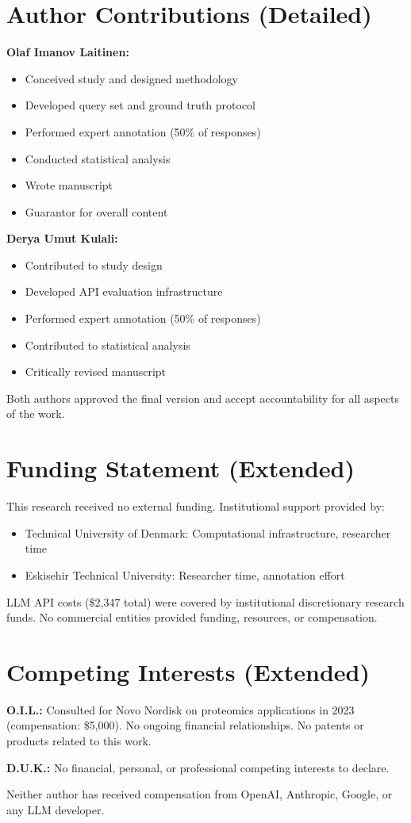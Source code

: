\documentclass[11pt,a4paper]{article}
\begin{document}
\section{Author Contributions (Detailed)}

\textbf{Olaf Imanov Laitinen:}
\begin{itemize}
    \item Conceived study and designed methodology
    \item Developed query set and ground truth protocol
    \item Performed expert annotation (50\% of responses)
    \item Conducted statistical analysis
    \item Wrote manuscript
    \item Guarantor for overall content
\end{itemize}

\textbf{Derya Umut Kulali:}
\begin{itemize}
    \item Contributed to study design
    \item Developed API evaluation infrastructure
    \item Performed expert annotation (50\% of responses)
    \item Contributed to statistical analysis
    \item Critically revised manuscript
\end{itemize}

Both authors approved the final version and accept accountability for all aspects of the work.

\section{Funding Statement (Extended)}

This research received no external funding. Institutional support provided by:

\begin{itemize}
    \item Technical University of Denmark: Computational infrastructure, researcher time
    \item Eskisehir Technical University: Researcher time, annotation effort
\end{itemize}

LLM API costs (\$2,347 total) were covered by institutional discretionary research funds. No commercial entities provided funding, resources, or compensation.

\section{Competing Interests (Extended)}

\textbf{O.I.L.:} Consulted for Novo Nordisk on proteomics applications in 2023 (compensation: \$5,000). No ongoing financial relationships. No patents or products related to this work.

\textbf{D.U.K.:} No financial, personal, or professional competing interests to declare.

Neither author has received compensation from OpenAI, Anthropic, Google, or any LLM developer.
\end{document}
